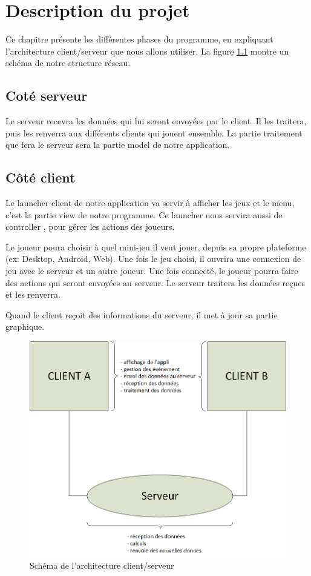 \documentclass{report}
\begin{document}
\chapter{Description du projet}\label{desciption-projet}
Ce chapitre présente les différentes phases du programme, en expliquant l'architecture client/serveur que nous allons utiliser. La figure \ref{schema-architecture} montre un schéma de notre
structure réseau.
\section{Coté serveur}
Le serveur recevra les données qui lui seront envoyées par le client. Il les traitera, puis les renverra aux différents clients qui jouent ensemble. La partie traitement que fera le serveur
sera la partie \og model \fg{} de notre application.
\section{Côté client}
Le launcher client de notre application va servir à afficher les jeux et le menu, c'est la partie \og view \fg{} de notre programme. Ce launcher nous servira aussi de \og controller \fg{}, pour gérer
les actions des joueurs.\par
Le joueur poura choisir à quel mini-jeu il veut jouer, depuis sa propre plateforme (ex: Desktop, Android, Web). Une fois le jeu choisi, il ouvrira une connexion de jeu avec le serveur et un autre joueur.
Une fois connecté, le joueur pourra faire des actions qui seront envoyées au serveur. Le serveur traitera les données reçues et les renverra. \par
Quand le client reçoit des informations du serveur, il met à jour
sa partie graphique.
\begin{figure}[ht]
	\centering\includegraphics[width=12cm]{maquette_base}
	\caption{Schéma de l'architecture client/serveur}
	\label{schema-architecture}
\end{figure}
\end{document}
